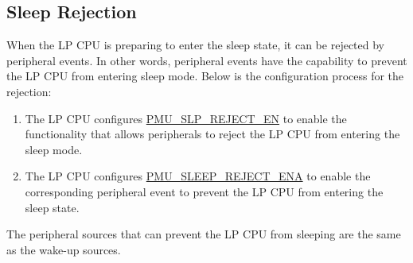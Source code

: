 \documentclass[main\_\_EN.tex]{subfiles}
\begin{document}
\subsection{Sleep Rejection}

When the LP CPU is preparing to enter the sleep state, it can be rejected by peripheral events. In other words, peripheral events have the capability to prevent the LP CPU from entering sleep mode. Below is the configuration process for the rejection:

\begin{enumerate}
    \item The LP CPU configures \hyperref[fielddesc:PMUSLPREJECTEN]{PMU\_SLP\_REJECT\_EN} to enable the functionality that allows peripherals to reject the LP CPU from entering the sleep mode.
    \item The LP CPU configures \hyperref[fielddesc:PMUSLEEPREJECTENA]{PMU\_SLEEP\_REJECT\_ENA} to enable the corresponding peripheral event to prevent the LP CPU from entering the sleep state.
\end{enumerate}

The peripheral sources that can prevent the LP CPU from sleeping are the same as the wake-up sources.
\end{document}
